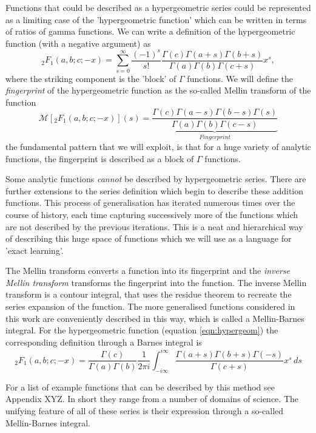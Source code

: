 \documentclass{article}
\begin{document}
Functions that could be described as a hypergeometric series could be represented as a limiting case of the 'hypergeometric function' which can be written in terms of ratios of gamma functions. We can write a definition of the hypergeometric function (with a negative argument) as
\begin{equation}
_2F_1(a,b;c;-x) = \sum_{s=0}^\infty \frac{(-1)^s}{s!} \frac{\Gamma(c)\Gamma(a+s)\Gamma(b+s)}{\Gamma(a)\Gamma(b)\Gamma(c+s)} x^s,
\label{eqn:hypergeom}
\end{equation}
where the striking component is the 'block' of $\Gamma$ functions. We will define the \emph{fingerprint} of the hypergeometric function as the so-called Mellin transform of the function 
\begin{equation}
\mathcal{M}\left[_2F_1(a,b;c;-x)\right](s) = \underbrace{\frac{\Gamma(c)\Gamma(a-s)\Gamma(b-s)\Gamma(s)}{\Gamma(a)\Gamma(b)\Gamma(c-s)}}_{Fingerprint}
\end{equation}
the fundamental pattern that we will exploit, is that for a huge variety of analytic functions, the fingerprint is described as a block of $\Gamma$ functions.

Some analytic functions \emph{cannot} be described by hypergeometric series. There are further extensions to the series definition which begin to describe these addition functions. This process of generalisation has iterated numerous times over the course of history, each time capturing successively more of the functions which are not described by the previous iterations. This is a neat and hierarchical way of describing this huge space of functions which we will use as a language for 'exact learning'.

The Mellin transform converts a function into its fingerprint and the \emph{inverse Mellin transform} transforms the fingerprint into the function. The inverse Mellin transform is a contour integral, that uses the residue theorem to recreate the series expansion of the function. The more generalised functions considered in this work are conveniently described in this way, which is called a Mellin-Barnes integral. For the hypergeometric function (equation \ref{eqn:hypergeom}) the corresponding definition through a Barnes integral is
\begin{equation}
_2F_1(a,b;c;-x) =\frac{\Gamma(c)}{\Gamma(a)\Gamma(b)} \frac{1}{2\pi i} \int_{-i\infty}^{i\infty} \frac{\Gamma(a+s)\Gamma(b+s)\Gamma(-s)}{\Gamma(c+s)}x^s\,ds
\end{equation}

{\color{blue}For a list of example functions that can be described by this method see Appendix XYZ. In short they range from a number of domains of science. The unifying feature of all of these series is their expression through a so-called Mellin-Barnes integral.}
\end{document}
